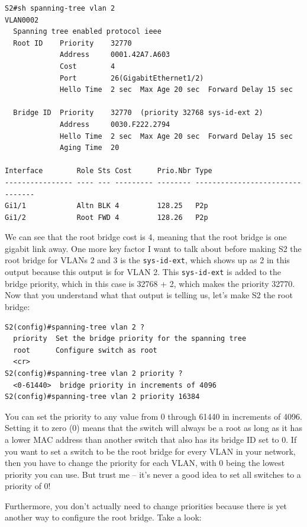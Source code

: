 \begin{verbatim}
S2#sh spanning-tree vlan 2
VLAN0002
  Spanning tree enabled protocol ieee
  Root ID    Priority    32770
             Address     0001.42A7.A603
             Cost        4
             Port        26(GigabitEthernet1/2)
             Hello Time  2 sec  Max Age 20 sec  Forward Delay 15 sec
 
  Bridge ID  Priority    32770  (priority 32768 sys-id-ext 2)
             Address     0030.F222.2794
             Hello Time  2 sec  Max Age 20 sec  Forward Delay 15 sec
             Aging Time  20
 
Interface        Role Sts Cost      Prio.Nbr Type
---------------- ---- --- --------- -------- --------------------------------
Gi1/1            Altn BLK 4         128.25   P2p
Gi1/2            Root FWD 4         128.26   P2p
\end{verbatim}

We can see that the root bridge cost is 4, meaning that the root bridge
is one gigabit link away. One more key factor I want to talk about
before making S2 the root bridge for VLANs 2 and 3 is the
\texttt{sys-id-ext}, which shows up as 2 in this output because this
output is for VLAN 2. This \texttt{sys-id-ext} is added to the bridge
priority, which in this case is 32768 + 2, which makes the priority
32770. Now that you understand what that output is telling us, let's
make S2 the root bridge:

\begin{verbatim}
S2(config)#spanning-tree vlan 2 ?
  priority  Set the bridge priority for the spanning tree
  root      Configure switch as root
  <cr>
S2(config)#spanning-tree vlan 2 priority ?
  <0-61440>  bridge priority in increments of 4096
S2(config)#spanning-tree vlan 2 priority 16384
\end{verbatim}

You can set the priority to any value from 0 through 61440 in increments
of 4096. Setting it to zero (0) means that the switch will always be a
root as long as it has a lower MAC address than another switch that also
has its bridge ID set to 0. If you want to set a switch to be the root
bridge for every VLAN in your network, then you have to change the
priority for each VLAN, with 0 being the lowest priority you can use.
But trust me -- it's never a good idea to set all switches to a priority
of 0!

Furthermore, you don't actually need to change priorities because there
is yet another way to configure the root bridge. Take a look:

